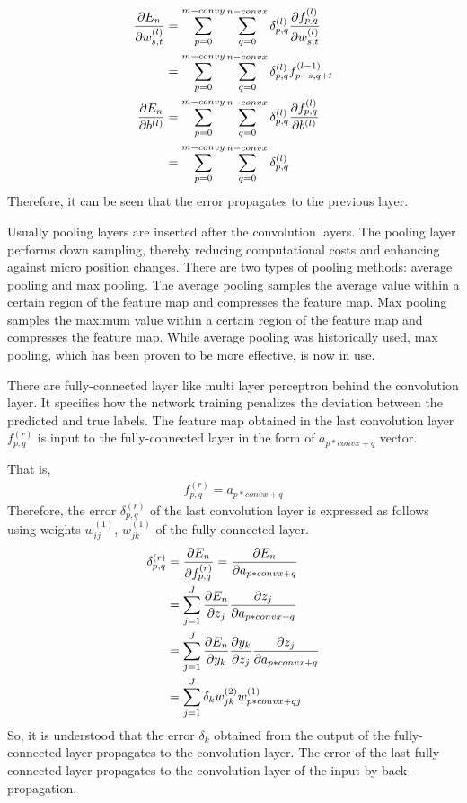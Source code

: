 \documentclass[a4paper,12pt]{article}
\begin{document}
\begin{align} \label{gradient conv}
\frac{\partial E_n}{\partial w^{(l)}_{s,t}}&=\sum_{p=0}^{m-convy}\sum_{q=0}^{n-convx}{\delta^{(l)}_{p,q}\frac{\partial f_{p,q}^{(l)}}{\partial w^{(l)}_{s,t}}} \notag \\
&=\sum_{p=0}^{m-convy}\sum_{q=0}^{n-convx}{\delta^{(l)}_{p,q}f^{(l-1)}_{p+s, q+t}} \\
\frac{\partial E_n}{\partial b^{(l)}} &= \sum_{p=0}^{m-convy}\sum_{q=0}^{n-convx}{\delta^{(l)}_{p,q}\frac{\partial f_{p,q}^{(l)}}{\partial b^{(l)}}} \notag \\
&=\sum_{p=0}^{m-convy}\sum_{q=0}^{n-convx}{\delta^{(l)}_{p,q}}
\end{align}
Therefore, it can be seen that the error propagates to the previous layer.



Usually pooling layers are inserted after the convolution layers.
The pooling layer performs down sampling, thereby reducing computational costs and enhancing against micro position changes. There are two types of pooling methods: average pooling and max pooling.
The average pooling samples the average value within a certain region of the feature map and compresses the feature map. Max pooling samples the maximum value within a certain region of the feature map and compresses the feature map. While average pooling was historically used, max pooling, which has been proven to be more effective, is now in use.





There are fully-connected layer like multi layer perceptron behind the convolution layer. It specifies how the network training penalizes the deviation between the predicted and true labels.
The feature map obtained in the last convolution layer $f^{(r)}_{p,q}$ is input to the fully-connected layer in the form of $a_{p*convx+q}$ vector.  \par
That is,
\begin{align} \label{full input}
f^{(r)}_{p,q}=a_{p*convx+q}
\end{align}
Therefore, the error $\delta^{(r)}_{p,q}$ of the last convolution layer is expressed as follows using weights $w_{ij}^{(1)}$, $w_{jk}^{(1)}$ of the fully-connected layer.
\begin{align} \label{last converror}
\delta^{(r)}_{p,q}&=\frac{\partial E_n}{\partial f_{p,q}^{(r)}}=\frac{\partial E_n}{\partial a_{p*convx+q}} \notag \\
&=\sum_{j=1}^{J}{\frac{\partial E_n}{\partial z_j}\frac{\partial z_j}{\partial a_{p*convx+q}}} \notag \\
&=\sum_{j=1}^{J}{\frac{\partial E_n}{\partial y_k}\frac{\partial y_k}{\partial z_j}\frac{\partial z_j}{\partial a_{p*convx+q}}} \notag \\
&=\sum_{j=1}^{J}{\delta_kw^{(2)}_{jk}w^{(1)}_{p*convx+qj}}
\end{align}
So, it is understood that the error $\delta_k$ obtained from the output of the fully-connected layer propagates to the convolution layer.
The error of the last fully-connected layer propagates to the convolution layer of the input by back-propagation.
\end{document}
